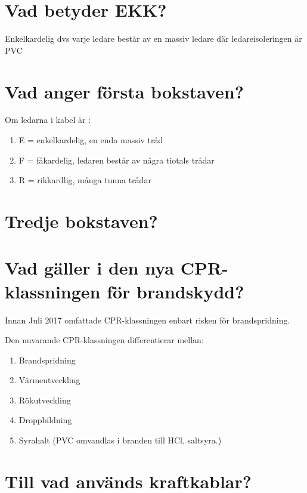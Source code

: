 \documentclass[a4paper,swedish]{article}
\begin{document}
\setcounter{section}{14}
\section{Vad betyder EKK?}

Enkelkardelig dvs varje ledare består av en massiv ledare där ledareisoleringen är PVC

\setcounter{section}{16}
\section{Vad anger första bokstaven?}

Om ledarna i kabel är :
\begin{enumerate}
\item E = enkelkardelig, en enda massiv tråd
\item F = fåkardelig, ledaren består av några tiotals trådar
\item R = rikkardlig, många tunna trådar
\end{enumerate}

\setcounter{section}{18}
\section{Tredje bokstaven?}



\setcounter{section}{20}
\section{Vad gäller i den nya CPR-klassningen för brandskydd?}

Innan Juli 2017 omfattade CPR-klassningen enbart risken för brandspridning.

Den nuvarande CPR-klassningen differentierar mellan:

\begin{center}
  \begin{enumerate}
  \item Brandspridning
  \item Värmeutveckling
  \item Rökutveckling
  \item Droppbildning
  \item Syrahalt (PVC omvandlas i branden till HCl, saltsyra.)
  \end{enumerate}
\end{center}

\setcounter{section}{22}
\section{Till vad används kraftkablar?}
\end{document}
